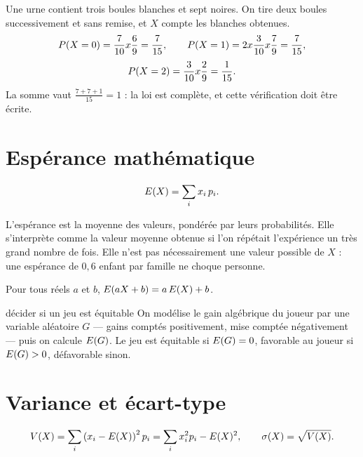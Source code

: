 \begin{exemple}
Une urne contient trois boules blanches et sept noires. On tire deux boules
successivement et sans remise, et $X$ compte les blanches obtenues.
\[
  P\!\left(X = 0\right) = \frac{7}{10} x \frac69 = \frac{7}{15},
  \qquad
  P\!\left(X = 1\right) = 2 x \frac{3}{10} x \frac79 = \frac{7}{15},
\]
\[
  P\!\left(X = 2\right) = \frac{3}{10} x \frac29 = \frac{1}{15}.
\]
La somme vaut $\frac{7+7+1}{15} = 1$ : la loi est complète, et cette
vérification doit être écrite.
\end{exemple}

\section{Espérance mathématique}

\begin{definition}[espérance]
\[
  E(X) = \sum_{i} x_{i}\,p_{i} .
\]
\end{definition}

\begin{remarque}
L'espérance est la moyenne des valeurs, pondérée par leurs probabilités. Elle
s'interprète comme la valeur moyenne obtenue si l'on répétait l'expérience un
très grand nombre de fois. Elle n'est pas nécessairement une valeur possible
de $X$ : une espérance de $0{,}6$ enfant par famille ne choque personne.
\end{remarque}

\begin{propriete}[linéarité]
Pour tous réels $a$ et $b$, $E(aX+b) = a\,E(X)+b$.
\end{propriete}

\begin{methode}{décider si un jeu est équitable}
On modélise le gain algébrique du joueur par une variable aléatoire $G$ —
gains comptés positivement, mise comptée négativement — puis on calcule
$E(G)$. Le jeu est équitable si $E(G) = 0$, favorable au joueur si
$E(G)>0$, défavorable sinon.
\end{methode}

\section{Variance et écart-type}

\begin{definition}
\[
  V(X) = \sum_{i}\left(x_{i}-E(X)\right)^{2}p_{i}
          = \sum_{i}x_{i}^{2}p_{i}-E(X)^{2},
  \qquad
  \sigma(X) = \sqrt{V(X)} .
\]
\end{definition}


